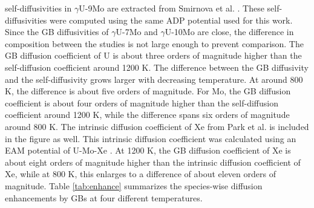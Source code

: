 \documentclass{elsarticle}
\providecommand{\DIFadd}[1]{{\protect\color{blue} \sf #1}} %
\providecommand{\DIFdel}[1]{}
\providecommand{\DIFaddbegin}{} %
\providecommand{\DIFaddend}{} %
\providecommand{\DIFdelbegin}{} %
\providecommand{\DIFdelend}{} %
\begin{document}
\DIFdel{Additional literature data on }\DIFdelend self-diffusivities in $\gamma$U-9Mo \DIFaddbegin \DIFadd{are extracted }\DIFaddend from Smirnova et al. \cite{smirnova2015}\DIFdelbegin \DIFdel{is included in Figure \ref{fig:umoxe} to provide perspective}\DIFdelend . These self-diffusivities were computed using the same ADP potential used for this work. Since the GB diffusivities of $\gamma$U-7Mo and $\gamma$U-10Mo are close, the difference in composition between the studies is not \DIFdelbegin \DIFdel{significant }\DIFdelend \DIFaddbegin \DIFadd{large }\DIFaddend enough to prevent \DIFdelbegin \DIFdel{a }\DIFdelend comparison. The GB diffusion coefficient of U is about three orders of magnitude higher than the self-diffusion coefficient \DIFdelbegin \DIFdel{at high temperatures}\DIFdelend \DIFaddbegin \DIFadd{around 1200 K}\DIFaddend . The difference between \DIFaddbegin \DIFadd{the }\DIFaddend GB diffusivity and \DIFaddbegin \DIFadd{the }\DIFaddend self-diffusivity grows larger with decreasing temperature. At around 800 K, the difference is about five orders of magnitude. For Mo, the GB diffusion coefficient is about four orders of magnitude higher than the self-diffusion coefficient \DIFdelbegin \DIFdel{at high temperatures}\DIFdelend \DIFaddbegin \DIFadd{around 1200 K}\DIFaddend , while the difference spans \DIFdelbegin \DIFdel{seven }\DIFdelend \DIFaddbegin \DIFadd{six }\DIFaddend orders of magnitude around 800 K. The intrinsic diffusion coefficient of Xe from Park et al. \cite{park2023} is included in the figure as well. This intrinsic diffusion coefficient was calculated using an EAM potential of U-Mo-Xe \cite{smirnova2013}. \DIFdelbegin \DIFdel{The difference between GB diffusion and intrinsic diffusion of Xe is more drastic than U and Mo. At high temperatures}\DIFdelend \DIFaddbegin \DIFadd{At 1200 K}\DIFaddend , the GB diffusion coefficient of Xe is about \DIFdelbegin \DIFdel{seven }\DIFdelend \DIFaddbegin \DIFadd{eight }\DIFaddend orders of magnitude higher than the intrinsic diffusion coefficient of Xe, while at 800 K, this enlarges to a difference of about \DIFdelbegin \DIFdel{ten }\DIFdelend \DIFaddbegin \DIFadd{eleven }\DIFaddend orders of magnitude. Table \ref{tab:enhance} summarizes the species-wise diffusion enhancements by GBs at four different temperatures.
\DIFdelbegin \DIFdel{It is apparent from the table that the diffusion enhancement is larger at lower temperatures. This means the overall diffusion in the material is dominated mostly by GB diffusion at lower temperatures, and thus GB diffusion is more important in the calculation of the effective diffusivity of the material.
The diffusion enhancement starts to wane at higher temperatures since the activation energy of GB diffusion is lower than that of bulk diffusion . This difference in activation energies is expected and is observable in Figure \ref{fig:umoxe}. Species-specific diffusion prefactors and activation energies are included in Tables \ref{tab:u10moArr}, \ref{tab:compArr}, \ref{tab:compArrHigh}, \ref{tab:compArrLow}, \ref{tab:u7mo}, \ref{tab:asym}, \ref{tab:u12mo}, and \ref{tab:xe}. 
}\DIFdelend 
\end{document}
